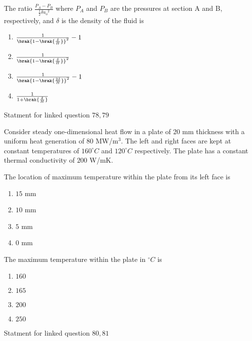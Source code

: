                             \item The ratio $\frac{P_A - P_B}{\frac{1}{2}\delta{u_o}^2}$ where $P_A$ and $P_B$ are the pressures at section A and B, respectively, and $\delta$ is the density of the fluid is
                            \begin{enumerate}
                                \item $ \frac{1}{\brak{1-\brak{\frac{\delta}{H}}}^2} -1$
                                \item $ \frac{1}{\brak{1-\brak{\frac{\delta}{H}}}^2}$
                                \item $ \frac{1}{\brak{1-\brak{\frac{2\delta}{H}}}^2} -1$
                                \item $ \frac{1}{1+\brak{\frac{\delta}{H}}}$
                            \end{enumerate}
                        Statment for linked question $78 ,79$


                        Consider steady one-dimensional heat flow in a plate of $20$ mm thickness with a uniform heat generation of $80$ MW/m$^3$. The left and right faces are kept at constant temperatures of $160^\circ C$ and $120^\circ C$ respectively. The plate has a constant thermal conductivity of $200$ W/mK. 
                        
                        \item The location of maximum temperature within the plate from its left face is
                        \begin{enumerate}
                            \item $15$ mm
                            \item $10$ mm
                            \item $5$ mm
                            \item $0$ mm
                        \end{enumerate}
                            \item The maximum temperature within the plate in $^\circ C$ is
                            \begin{enumerate}
                                \item $160$
                                \item $165$
                                \item $200$
                                \item $250$
                            \end{enumerate}
                        Statment for linked question $80,81$


